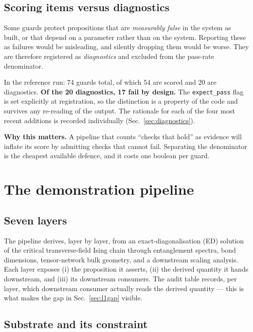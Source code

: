 \documentclass[11pt,a4paper]{article}
\newcommand{\code}[1]{\texttt{\small #1}}
\begin{document}
\subsection{Scoring items versus diagnostics}
\label{sec:split}

Some guards protect propositions that are \emph{measurably false} in the system as
built, or that depend on a parameter rather than on the system. Reporting these as
failures would be misleading, and silently dropping them would be worse. They are
therefore registered as \emph{diagnostics} and excluded from the pass-rate
denominator.

In the reference run: 74 guards total, of which 54 are scored and 20 are
diagnostics. \textbf{Of the 20 diagnostics, 17 fail by design.} The
\code{expect\_pass} flag is set explicitly at registration, so the distinction is a
property of the code and survives any re-reading of the output. The rationale for
each of the four most recent additions is recorded individually
(Sec.~\ref{sec:diagnostics}).

\medskip
\noindent\textbf{Why this matters.} A pipeline that counts ``checks that hold'' as
evidence will inflate its score by admitting checks that cannot fail. Separating
the denominator is the cheapest available defence, and it costs one boolean per
guard.

\section{The demonstration pipeline}
\label{sec:pipeline}

\subsection{Seven layers}

The pipeline derives, layer by layer, from an exact-diagonalisation (ED) solution
of the critical transverse-field Ising chain through entanglement spectra, bond
dimensions, tensor-network bulk geometry, and a downstream scaling analysis. Each
layer exposes (i) the proposition it asserts, (ii) the derived quantity it hands
downstream, and (iii) its downstream consumers. The audit table records, per layer,
which downstream consumer actually reads the derived quantity --- this is what makes
the gap in Sec.~\ref{sec:l1gap} visible.

\subsection{Substrate and its constraint}
\label{sec:substrate}
\end{document}
